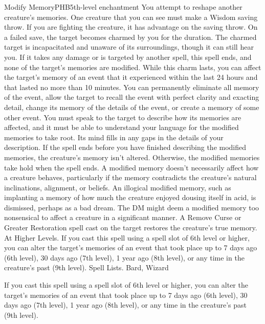 \begin{spell}{Modify Memory}{PHB}{5th-level enchantment}
{
}
You attempt to reshape another creature’s memories. One creature that you can see must make a Wisdom saving throw. If you are fighting the creature, it has advantage on the saving throw. On a failed save, the target becomes charmed by you for the duration. The charmed target is incapacitated and unaware of its surroundings, though it can still hear you. If it takes any damage or is targeted by another spell, this spell ends, and none of the target’s memories are modified.
While this charm lasts, you can affect the target’s memory of an event that it experienced within the last 24 hours and that lasted no more than 10 minutes. You can permanently eliminate all memory of the event, allow the target to recall the event with perfect clarity and exacting detail, change its memory of the details of the event, or create a memory of some other event.
You must speak to the target to describe how its memories are affected, and it must be able to understand your language for the modified memories to take root. Its mind fills in any gaps in the details of your description. If the spell ends before you have finished describing the modified memories, the creature’s memory isn’t altered. Otherwise, the modified memories take hold when the spell ends.
A modified memory doesn’t necessarily affect how a creature behaves, particularly if the memory contradicts the creature’s natural inclinations, alignment, or beliefs. An illogical modified memory, such as implanting a memory of how much the creature enjoyed dousing itself in acid, is dismissed, perhaps as a bad dream. The DM might deem a modified memory too nonsensical to affect a creature in a significant manner.
A Remove Curse or Greater Restoration spell cast on the target restores the creature’s true memory.
At Higher Levels. If you cast this spell using a spell slot of 6th level or higher, you can alter the target’s memories of an event that took place up to 7 days ago (6th level), 30 days ago (7th level), 1 year ago (8th level), or any time in the creature’s past (9th level).
Spell Lists. Bard, Wizard

 If you cast this spell using a spell slot of 6th level or higher, you can alter the target’s memories of an event that took place up to 7 days ago (6th level), 30 days ago (7th level), 1 year ago (8th level), or any time in the creature’s past (9th level).
\end{spell}

